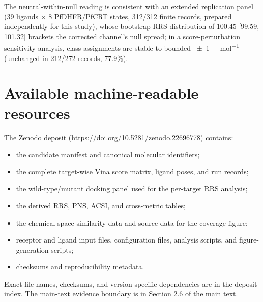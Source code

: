 \documentclass[11pt,a4paper]{article}
\begin{document}
	The neutral-within-null reading is consistent with an extended replication panel (39 ligands $\times$ 8 PfDHFR/PfCRT states, 312/312 finite records, prepared independently for this study), whose bootstrap RRS distribution of 100.45 [99.59, 101.32] brackets the corrected channel's null spread; in a score-perturbation sensitivity analysis, class assignments are stable to bounded \qty{\pm 1}{\kilo\calorie\per\mol} (unchanged in 212/272 records, 77.9\%).
	
	\section{Available machine-readable resources}\label{sec:sm_resources}
	The Zenodo deposit (\url{https://doi.org/10.5281/zenodo.22696778}) contains:
	\begin{itemize}
		\item the candidate manifest and canonical molecular identifiers;
		\item the complete target-wise Vina score matrix, ligand poses, and run records;
		\item the wild-type/mutant docking panel used for the per-target RRS analysis;
		\item the derived RRS, PNS, ACSI, and cross-metric tables;
		\item the chemical-space similarity data and source data for the coverage figure;
		\item receptor and ligand input files, configuration files, analysis scripts, and figure-generation scripts;
		\item checksums and reproducibility metadata.
	\end{itemize}
	Exact file names, checksums, and version-specific dependencies are in the deposit index. The main-text evidence boundary is in Section 2.6 of the main text.
	
	
	
	
\end{document}
